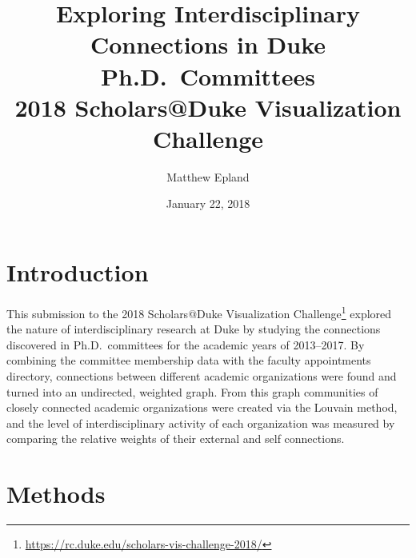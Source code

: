 \documentclass[notitlepage,aps,prd,nofootinbib]{revtex4-1}
\begin{document}
\title{Exploring Interdisciplinary Connections in Duke Ph.D.\ Committees\\2018 Scholars@Duke Visualization Challenge}
\author{Matthew\,\,Epland}
\date{January 22, 2018}

\maketitle

\section{Introduction}
This submission to the 2018 Scholars@Duke Visualization Challenge\footnote{\url{https://rc.duke.edu/scholars-vis-challenge-2018/}} explored the nature of interdisciplinary research at Duke by studying the connections discovered in Ph.D.\ committees for the academic years of 2013--2017. By combining the committee membership data with the faculty appointments directory, connections between different academic organizations were found and turned into an undirected, weighted graph. From this graph communities of closely connected academic organizations were created via the Louvain method, and the level of interdisciplinary activity of each organization was measured by comparing the relative weights of their external and self connections.


\section{Methods}
\end{document}
